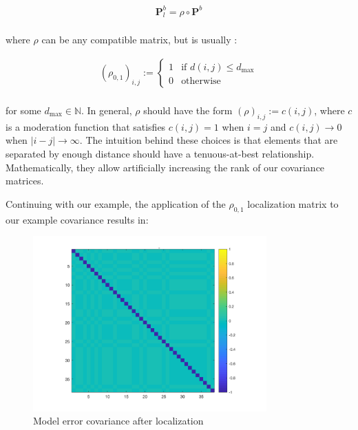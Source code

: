 \documentclass{article}
\begin{document}
\begin{gather*}
\mathbf{P}_l^b = \rho \circ \mathbf{P}^b \\
\end{gather*}

where $\rho$ can be any compatible matrix, but is usually \cite{Bannister2017}:

\begin{gather*}
(\rho_{0,1})_{i, j} :=
\left\{
\begin{array}{ll}
1 & \mbox{if } d(i, j) \leq d_\text{max} \\
0 & \mbox{otherwise}
\end{array}
\right. \\
\end{gather*}

for some $d_\text{max} \in \mathbb{N}$. In general, $\rho$ should have the form $(\rho)_{i, j} := c(i, j)$, where $c$ is a moderation function that satisfies $c(i, j) = 1$ when $i = j$ and $c(i, j) \rightarrow 0$ when $|i - j| \rightarrow \infty$. The intuition behind these choices is that elements that are separated by enough distance should have a tenuous-at-best relationship. Mathematically, they allow artificially increasing the rank of our covariance matrices.

Continuing with our example, the application of the $\rho_{0,1}$ localization matrix to our example covariance results in:

\begin{figure}[H]
\begin{center}
\includegraphics[width=0.8\textwidth]{covariance_after_localization}
\caption{Model error covariance after localization \cite{ROInets}}
\end{center}
\end{figure}
\end{document}
